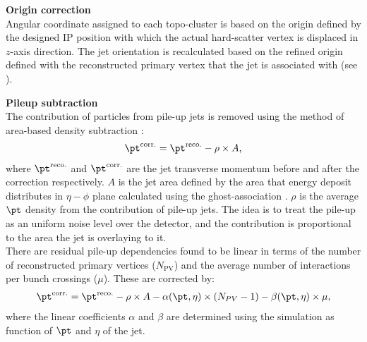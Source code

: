 \begin{description}
\item \textbf{Origin correction} \\
Angular coordinate assigned to each topo-cluster is based on the origin defined by the designed IP position with which the actual hard-scatter vertex is displaced in $z$-axis direction. The jet orientation is recalculated based on the refined origin defined with the reconstructed primary vertex that the jet is associated with (see \cite{JESmeas_unct_Run1_inclOC}). 

\item \textbf{Pileup subtraction} \\
The contribution of particles from pile-up jets is removed using the method of area-based density subtraction \cite{145_areaBasedPUsub}:
\begin{align}
\pt^{\mathrm{corr.}} = \pt^{\mathrm{reco.}} - \rho \times A,
\label{eq::PUresidual}
\end{align}
where $\pt^{\mathrm{reco.}}$ and $\pt^{\mathrm{corr.}}$ are the jet transverse momentum before and after the correction respectively. $A$ is the jet area defined by the area that energy deposit distributes in $\eta-\phi$ plane calculated using the ghost-association \cite{143_JetFindingReview}. $\rho$ is the average $\pt$ density from the contribution of pile-up jets. The idea is to treat the pile-up as an uniform noise level over the detector, and the contribution is proportional to the area the jet is overlaying to it. \\

There are residual pile-up dependencies found to be linear in terms of the number of reconstructed primary vertices ($N_{\mathrm{PV}}$) and the average number of interactions per bunch crossings ($\mu$). These are corrected by:
\begin{align}
\pt^{\mathrm{corr.}} = \pt^{\mathrm{reco.}} - \rho \times A - \alpha(\pt,\eta)  \times (N_{PV}-1) - \beta(\pt,\eta) \times \mu,
\label{eq::PUresidual}
\end{align}
where the linear coefficients $\alpha$ and $\beta$ are determined using the simulation as function of $\pt$ and $\eta$ of the jet.






\end{description}
